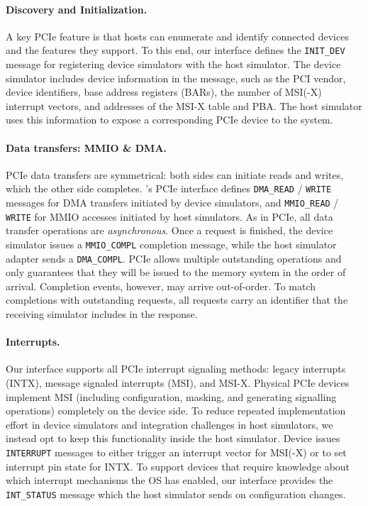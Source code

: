 \paragraph{Discovery and Initialization.}
A key PCIe feature is that hosts can enumerate and identify connected
devices and the features they support.
%
To this end, our interface defines the \texttt{INIT\_DEV} message for
registering device simulators with the host simulator.
%
The device simulator includes device information in the message, such as the PCI
vendor, device identifiers, base address registers (BARs), the number of MSI(-X)
interrupt vectors, and addresses of the MSI-X table and PBA.
%
The host simulator uses this information to expose a corresponding PCIe device
to the system.


\paragraph{Data transfers: MMIO \& DMA.}
PCIe data transfers are symmetrical: both sides can initiate reads
and writes, which the other side completes.
%
\sysname{}'s PCIe interface defines \texttt{DMA\_READ} /
\texttt{WRITE} messages for DMA transfers initiated by device
simulators, and \texttt{MMIO\_READ} / \texttt{WRITE} for MMIO accesses
initiated by host simulators.
%
As in PCIe, all data transfer operations are \textit{asynchronous}.
%
Once a request is finished, the device simulator issues a \texttt{MMIO\_COMPL}
completion message, while the host simulator adapter sends a
\texttt{DMA\_COMPL}.
%
PCIe allows multiple outstanding operations and only guarantees that
they will be issued to the memory system in the order of arrival.
%
Completion events, however, may arrive out-of-order.
%
To match completions with outstanding requests, all requests carry an
identifier that the receiving simulator includes in the response.

\paragraph{Interrupts.}
Our interface supports all PCIe interrupt signaling methods:
legacy interrupts (INTX), message signaled interrupts (MSI), and
MSI-X.
%
Physical PCIe devices implement MSI (including configuration,
masking, and generating signalling operations) completely on the
device side.
%
To reduce repeated implementation effort in device simulators and
integration challenges in host simulators, we instead opt to keep this
functionality inside the host simulator.
%
Device issues \texttt{INTERRUPT} messages to either trigger an
interrupt vector for MSI(-X) or to set interrupt pin state for INTX.
%
To support devices that require knowledge about which interrupt
mechanisms the OS has enabled,
our interface provides the \texttt{INT\_STATUS} message which the host simulator
sends on configuration changes.



